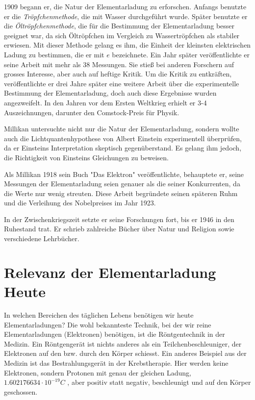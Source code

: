 1909 begann er, die Natur der Elementarladung zu erforschen. Anfangs benutzte er die \textit{Tröpfchenmethode}, die mit Wasser durchgeführt wurde. Später benutzte er die \textit{Öltröpfchenmethode}, die für die Bestimmung der Elementarladung besser geeignet war, da sich Öltröpfchen im Vergleich zu Wassertröpfchen als stabiler erwiesen.  Mit dieser Methode gelang es ihm, die Einheit der kleinsten elektrischen Ladung zu bestimmen, die er mit $e$ bezeichnete. Ein Jahr später veröffentlichte er seine Arbeit mit mehr als 38 Messungen. Sie stieß bei anderen Forschern auf grosses Interesse, aber auch auf heftige Kritik. Um die Kritik zu entkräften, veröffentlichte er drei Jahre später eine weitere Arbeit über die experimentelle Bestimmung der Elementarladung, doch auch diese Ergebnisse wurden angezweifelt. In den Jahren vor dem Ersten Weltkrieg erhielt er 3-4 Auszeichnungen, darunter den Comstock-Preis für Physik.

Millikan untersuchte nicht nur die Natur der Elementarladung, sondern wollte auch die Lichtquantenhypothese von Albert {\sc Einstein} experimentell überprüfen, da er Einsteins Interpretation skeptisch gegenüberstand. Es gelang ihm jedoch, die Richtigkeit von Einsteins Gleichungen zu beweisen.

Als Millikan 1918 sein Buch "Das Elektron" veröffentlichte, behauptete er, seine Messungen der Elementarladung seien genauer als die seiner Konkurrenten, da die Werte nur wenig streuten. Diese Arbeit begründete seinen späteren Ruhm und die Verleihung des Nobelpreises im Jahr 1923. 

In der Zwischenkriegszeit setzte er seine Forschungen fort, bis er 1946 in den Ruhestand trat. Er schrieb zahlreiche Bücher über Natur und Religion sowie verschiedene Lehrbücher. \parencite[vgl.][Millikan]{dewiki:247237013}

\section{Relevanz der Elementarladung Heute}\label{sec:relevanz}
In welchen Bereichen des täglichen Lebens benötigen wir heute Elementarladungen? Die wohl bekannteste Technik, bei der wir reine Elementarladungen (Elektronen) benötigen, ist die Röntgentechnik in der Medizin. Ein Röntgengerät ist nichts anderes als ein Teilchenbeschleuniger, der Elektronen auf den bzw. durch den Körper schiesst. Ein anderes Beispiel aus der Medizin ist das Bestrahlungsgerät in der Krebstherapie. Hier werden keine Elektronen, sondern Protonen mit genau der gleichen Ladung, $1.602176634 \cdot 10^{-19} C$ \parencite[123]{fundamentum_mathe}, aber positiv statt negativ, beschleunigt und auf den Körper geschossen. 

